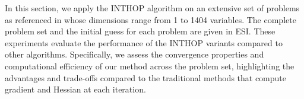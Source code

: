 \documentclass{elsarticle}
\numberwithin{equation}{section}
\begin{document}
In this section, we apply the INTHOP algorithm on an extensive set of problems as referenced in \cite{problemset} whose dimensions range from 1 to 1404 variables. The complete problem set and the initial guess for each problem are given in ESI. These experiments evaluate the performance of the INTHOP variants compared to other algorithms. Specifically, we assess the convergence properties and computational efficiency of our method across the problem set, highlighting the advantages and trade-offs compared to the traditional methods that compute gradient and Hessian at each iteration.
\end{document}
